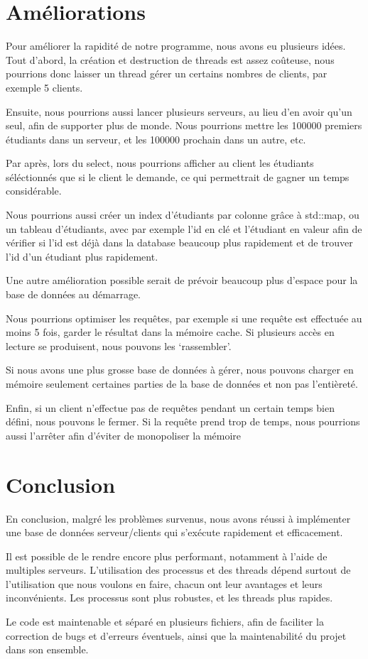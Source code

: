 \documentclass[utf8]{article}
\begin{document}
\begin{large}
\par
\section{Améliorations}
\par
\indent

Pour améliorer la rapidité de notre programme, nous avons eu plusieurs idées.
Tout d'abord, la création et destruction de threads est assez coûteuse, nous
pourrions donc laisser un thread gérer un certains nombres de clients, par
exemple 5 clients.
\par

\par
\indent

Ensuite, nous pourrions aussi lancer plusieurs serveurs, au lieu d'en avoir qu'un seul,
afin de supporter plus de monde. Nous pourrions mettre les 100000 premiers
étudiants dans un serveur, et les 100000 prochain dans un autre, etc.

Par après, lors du select, nous pourrions afficher au client les étudiants
séléctionnés que si le client le demande, ce qui permettrait de gagner un temps
considérable.

Nous pourrions aussi créer un index d'étudiants par colonne grâce à std::map, ou
un tableau d'étudiants, avec par exemple l'id en clé et l'étudiant en valeur
afin de vérifier si l'id est déjà dans la database beaucoup plus rapidement et
de trouver l'id d'un étudiant plus rapidement.

Une autre amélioration possible serait de prévoir beaucoup plus d'espace pour la
base de données au démarrage.

Nous pourrions optimiser les requêtes, par exemple si une requête est effectuée au
moins 5 fois, garder le résultat dans la mémoire cache. Si plusieurs accès en
lecture se produisent, nous pouvons les `rassembler'.

Si nous avons une plus grosse base de données à gérer, nous pouvons charger en
mémoire seulement certaines parties de la base de données et non pas l'entièreté.

Enfin, si un client n'effectue pas de requêtes pendant un certain temps bien
défini, nous pouvons le fermer. Si la requête prend trop de temps, nous
pourrions aussi l'arrêter afin d'éviter de monopoliser la mémoire
\par
\section{Conclusion}
\par
\indent
En conclusion, malgré les problèmes survenus, nous avons réussi à implémenter
une base de données serveur/clients qui s'exécute rapidement et
efficacement.
\par 
Il est possible de le rendre encore plus performant, notamment à l'aide de
multiples serveurs. L'utilisation des processus et des threads dépend surtout de
l'utilisation que nous voulons en faire, chacun ont leur avantages et leurs
inconvénients. Les processus sont plus robustes, et les threads plus rapides.

Le code est maintenable et séparé en plusieurs fichiers,
afin de faciliter la correction de bugs et d'erreurs éventuels, ainsi que la
maintenabilité du projet dans son ensemble.
\par

\end{large}
\end{document}
